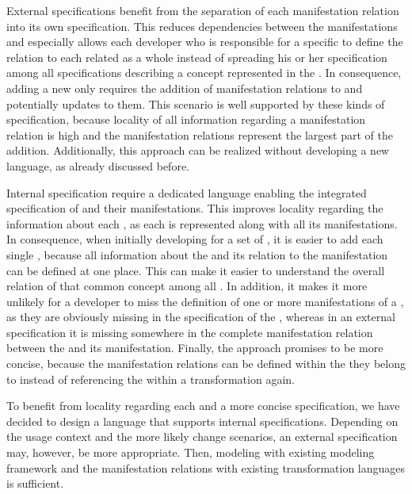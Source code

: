 External specifications benefit from the separation of each manifestation relation into its own specification.
This reduces dependencies between the manifestations and especially allows each developer who is responsible for a specific \concretemetamodel to define the relation to each related \conceptmetamodel as a whole instead of spreading his or her specification among all \commonalities specifications describing a concept represented in the \concretemetamodel.
In consequence, adding a new \concretemetamodel only requires the addition of manifestation relations to \conceptmetamodels and potentially updates to them.
This scenario is well supported by these kinds of specification, because locality of all information regarding a manifestation relation is high and the manifestation relations represent the largest part of the addition.
Additionally, this approach can be realized without developing a new language, as already discussed before.

Internal specification require a dedicated language enabling the integrated specification of \commonalities and their manifestations.
This improves locality regarding the information about each \commonality, as each \commonality is represented along with all its manifestations.
In consequence, when initially developing \commonalities for a set of \concretemetamodels, it is easier to add each single \commonality, because all information about the \commonality and its relation to the manifestation can be defined at one place.
This can make it easier to understand the overall relation of that common concept among all \concretemetamodels.
In addition, it makes it more unlikely for a developer to miss the definition of one or more manifestations of a \commonality, as they are obviously missing in the specification of the \commonality, whereas in an external specification it is missing somewhere in the complete manifestation relation between the \conceptmetamodel and its manifestation.
Finally, the approach promises to be more concise, because the manifestation relations can be defined within the \commonality they belong to instead of referencing the \commonality within a transformation again.

To benefit from locality regarding each \commonality and a more concise specification, we have decided to design a language that supports internal specifications.
Depending on the usage context and the more likely change scenarios, an external specification may, however, be more appropriate.
Then, modeling \concretemetamodels with existing modeling framework and the manifestation relations with existing transformation languages is sufficient.


